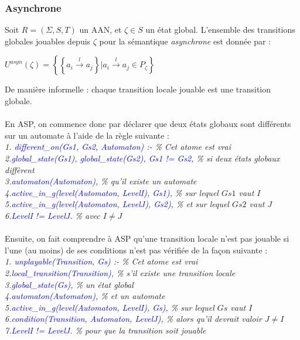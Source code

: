 \documentclass[12pt,a4paper]{article}
\begin{document}
\subsubsection{Asynchrone}
Soit $R = (\Sigma,S,T)$ un AAN, et $\zeta\in S$ un état global. L'ensemble des transitions globales jouables depuis $\zeta$ pour la sémantique \emph{asynchrone} est donnée par :
\begin{center}
	$U^{asyn}(\zeta)=\left\{\left\{a_i\xrightarrow{l} a_j\right\}|a_i\xrightarrow{l} a_j\in P_{\zeta}\right\}$
\end{center}
De manière informelle : chaque transition locale jouable est une transition globale.\\ \\
En ASP, on commence donc par déclarer que deux états globaux sont différents sur un automate à l'aide de la règle suivante :\\
\emph{
1. \textcolor{blue}{different\_on(Gs1, Gs2, Automaton) :-} \% Cet atome est vrai\\
2.\qquad \textcolor{blue}{global\_state(Gs1), global\_state(Gs2), Gs1 != Gs2,} \% si deux états globaux diffèrent\\
3.\qquad \textcolor{blue}{automaton(Automaton),} \% qu'il existe un automate\\
4.\qquad \textcolor{blue}{active\_in\_g(level(Automaton, LevelI), Gs1),} \% sur lequel $Gs1$ vaut $I$\\
5.\qquad \textcolor{blue}{active\_in\_g(level(Automaton, LevelJ), Gs2),} \% et sur lequel $Gs2$ vaut $J$\\
6.\qquad \textcolor{blue}{LevelI != LevelJ.} \% avec $I \neq J$\\ \\
}
Ensuite, on fait comprendre à ASP qu'une transition locale n'est pas jouable si l'une (au moins) de ses conditions n'est pas vérifiée de la façon suivante :\\
\emph{
1. \textcolor{blue}{unplayable(Transition, Gs) :-} \% Cet atome est vrai\\
2.\qquad \textcolor{blue}{local\_transition(Transition),} \% s'il existe une transition locale\\
3.\qquad \textcolor{blue}{global\_state(Gs),} \% un état global\\
4.\qquad \textcolor{blue}{automaton(Automaton),} \% et un automate\\
5.\qquad \textcolor{blue}{active\_in\_g(level(Automaton, LevelI), Gs),} \% sur lequel $Gs$ vaut $I$\\
6.\qquad \textcolor{blue}{condition(Transition, Automaton, LevelJ),} \% alors qu'il devrait valoir $J\neq I$\\
7.\qquad \textcolor{blue}{LevelI != LevelJ.} \% pour que la transition soit jouable\\ \\
}
\end{document}
